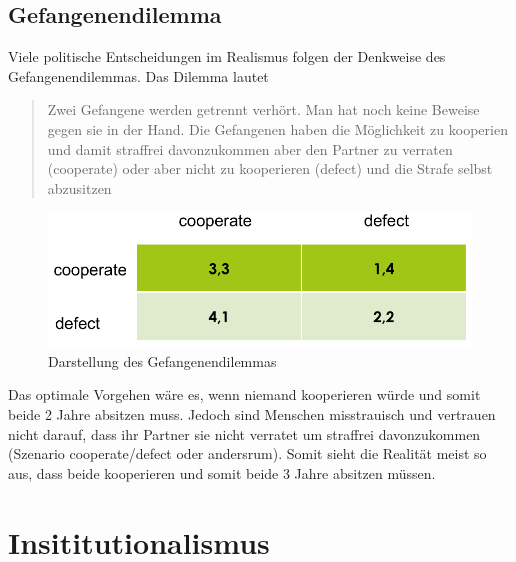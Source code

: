 \documentclass[a4paper, 11pt]{article}
\begin{document}
\subsection{Gefangenendilemma}
Viele politische Entscheidungen im Realismus folgen der Denkweise des Gefangenendilemmas. Das Dilemma lautet

\begin{quote}
	Zwei Gefangene werden getrennt verhört. Man hat noch keine Beweise gegen sie in der Hand. Die Gefangenen haben die Möglichkeit zu kooperien und damit straffrei davonzukommen aber den Partner zu verraten (cooperate) oder aber nicht zu kooperieren (defect) und die Strafe selbst abzusitzen 
\end{quote}

\begin{figure}[htb]
	\centering
	\includegraphics[keepaspectratio=true,height=10\baselineskip]{Gefangenendilemma}
	\caption{Darstellung des Gefangenendilemmas}
	\label{fig:gefangenendilemma}
\end{figure}

Das optimale Vorgehen wäre es, wenn niemand kooperieren würde und somit beide 2 Jahre absitzen muss. Jedoch sind Menschen misstrauisch und vertrauen nicht darauf, dass ihr Partner sie nicht verratet um straffrei davonzukommen (Szenario cooperate/defect oder andersrum). Somit sieht die Realität meist so aus, dass beide kooperieren und somit beide 3 Jahre absitzen müssen.

\newpage

\section{Insititutionalismus}
\end{document}
